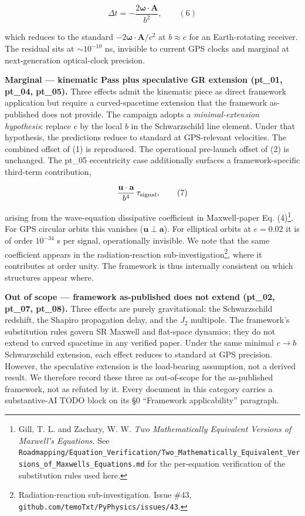 \documentclass[
  11pt,
]{article}
\begin{document}
\[\Delta t = -\frac{2\boldsymbol{\omega} \cdot \mathbf{A}}{b^2}, \qquad (6)\]

which reduces to the standard
\(-2\boldsymbol{\omega} \cdot \mathbf{A} / c^2\) at \(b \approx c\) for
an Earth-rotating receiver. The residual sits at \(\sim 10^{-10}\) ns,
invisible to current GPS clocks and marginal at next-generation
optical-clock precision.

\textbf{Marginal --- kinematic Pass plus speculative GR extension
(pt\_01, pt\_04, pt\_05).} Three effects admit the kinematic piece as
direct framework application but require a curved-spacetime extension
that the framework as-published does not provide. The campaign adopts a
\emph{minimal-extension hypothesis}: replace \(c\) by the local \(b\) in
the Schwarzschild line element. Under that hypothesis, the predictions
reduce to standard at GPS-relevant velocities. The combined offset of
(1) is reproduced. The operational pre-launch offset of (2) is
unchanged. The pt\_05 eccentricity case additionally surfaces a
framework-specific third-term contribution,

\[\frac{\mathbf{u} \cdot \mathbf{a}}{b^4} \, \tau_{\rm signal}, \qquad (7)\]

arising from the wave-equation dissipative coefficient in Maxwell-paper
Eq. (4)\footnote{Gill, T. L. and Zachary, W. W. \emph{Two Mathematically
  Equivalent Versions of Maxwell's Equations.} See
  \texttt{Roadmapping/Equation\_Verification/Two\_Mathematically\_Equivalent\_Versions\_of\_Maxwells\_Equations.md}
  for the per-equation verification of the substitution rules used here.}.
For GPS circular orbits this vanishes (\(\mathbf{u} \perp \mathbf{a}\)).
For elliptical orbits at \(e = 0.02\) it is of order \(10^{-34}\) s per
signal, operationally invisible. We note that the same coefficient
appears in the radiation-reaction sub-investigation\footnote{Radiation-reaction
  sub-investigation. Issue \#43,
  \texttt{github.com/temoTxt/PyPhysics/issues/43}.}, where it
contributes at order unity. The framework is thus internally consistent
on which structures appear where.

\textbf{Out of scope --- framework as-published does not extend (pt\_02,
pt\_07, pt\_08).} Three effects are purely gravitational: the
Schwarzschild redshift, the Shapiro propagation delay, and the \(J_2\)
multipole. The framework's substitution rules govern SR Maxwell and
flat-space dynamics; they do not extend to curved spacetime in any
verified paper. Under the same minimal \(c \to b\) Schwarzschild
extension, each effect reduces to standard at GPS precision. However,
the speculative extension is the load-bearing assumption, not a derived
result. We therefore record these three as out-of-scope for the
as-published framework, not as refuted by it. Every document in this
category carries a substantive-AI TODO block on its §0 ``Framework
applicability'' paragraph.
\end{document}
